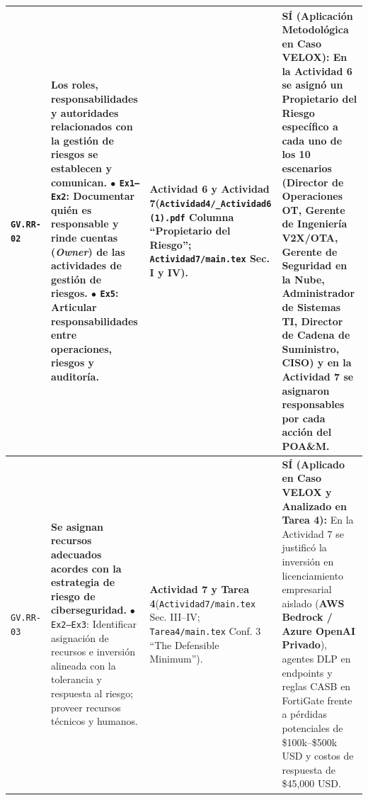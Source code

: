 \documentclass[letterpaper,11pt]{article}
\begin{document}
\begin{longtable}{|C{1.5cm}|L{5.3cm}|L{4.3cm}|L{5.8cm}|}
\texttt{GV.RR-02} &
\textbf{Los roles, responsabilidades y autoridades relacionados con la gestión de riesgos se establecen y comunican.}\newline
$\bullet$ \texttt{Ex1--Ex2}: Documentar quién es responsable y rinde cuentas (\textit{Owner}) de las actividades de gestión de riesgos.\newline
$\bullet$ \texttt{Ex5}: Articular responsabilidades entre operaciones, riesgos y auditoría. &
\textbf{Actividad 6 y Actividad 7}\newline (\texttt{Actividad4/\_Actividad6 (1).pdf} Columna ``Propietario del Riesgo''; \texttt{Actividad7/main.tex} Sec. I y IV). &
\textbf{SÍ (Aplicación Metodológica en Caso VELOX):}\newline
En la Actividad 6 se asignó un \textbf{Propietario del Riesgo} específico a cada uno de los 10 escenarios (Director de Operaciones OT, Gerente de Ingeniería V2X/OTA, Gerente de Seguridad en la Nube, Administrador de Sistemas TI, Director de Cadena de Suministro, CISO) y en la Actividad 7 se asignaron responsables por cada acción del POA\&M. \\
\hline

\texttt{GV.RR-03} &
\textbf{Se asignan recursos adecuados acordes con la estrategia de riesgo de ciberseguridad.}\newline
$\bullet$ \texttt{Ex2--Ex3}: Identificar asignación de recursos e inversión alineada con la tolerancia y respuesta al riesgo; proveer recursos técnicos y humanos. &
\textbf{Actividad 7 y Tarea 4}\newline (\texttt{Actividad7/main.tex} Sec. III--IV; \texttt{Tarea4/main.tex} Conf. 3 ``The Defensible Minimum''). &
\textbf{SÍ (Aplicado en Caso VELOX y Analizado en Tarea 4):}\newline
En la Actividad 7 se justificó la inversión en licenciamiento empresarial aislado (\textbf{AWS Bedrock / Azure OpenAI Privado}), agentes DLP en endpoints y reglas CASB en FortiGate frente a pérdidas potenciales de \$100k--\$500k USD y costos de respuesta de \$45,000 USD. \\
\hline


\end{longtable}
\end{document}
